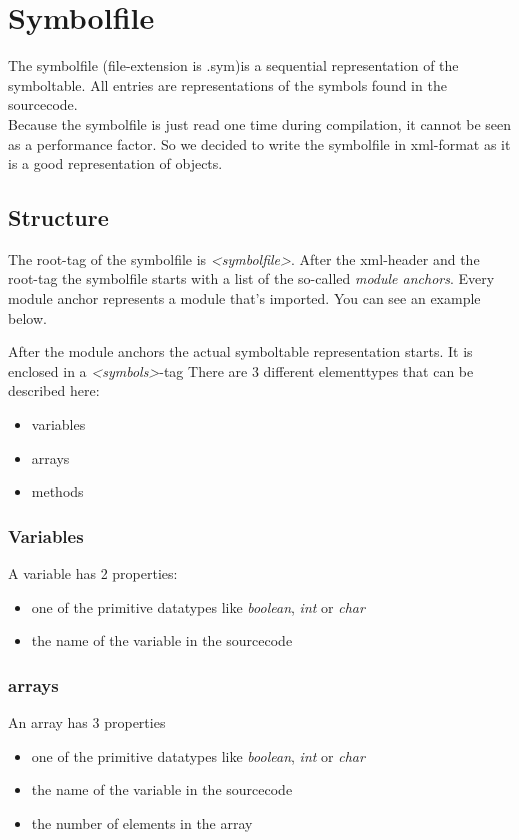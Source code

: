 \section{Symbolfile}
The symbolfile (file-extension is .sym)is a sequential representation of the
symboltable. All entries
are representations of the symbols found in the sourcecode. \\
Because the symbolfile is just read one time during compilation, it cannot be
seen as a performance factor. So we decided to write the symbolfile in
xml-format as it is a good representation of objects. 
\subsection{Structure}
The root-tag of the symbolfile is \emph{<symbolfile>}. After the xml-header and
the root-tag the symbolfile starts with a list of the so-called \emph{module anchors}. Every
module anchor represents a module that's imported. You can see an example below.

After the module anchors the actual symboltable representation starts. It is
enclosed in a \emph{<symbols>}-tag There are 3 different elementtypes that can be described here:
\begin{itemize}
  \item variables
  \item arrays
  \item methods 
\end{itemize}
\subsubsection{Variables}
A variable has 2 properties: 
\begin{itemize}
  \item one of the primitive datatypes like \emph{boolean}, \emph{int} or \emph{char}
  \item the name of the variable in the sourcecode
\end{itemize}

\subsubsection{arrays}
An array has 3 properties
\begin{itemize}
  \item one of the primitive datatypes like \emph{boolean}, \emph{int} or \emph{char}
  \item the name of the variable in the sourcecode
  \item the number of elements in the array
\end{itemize}


